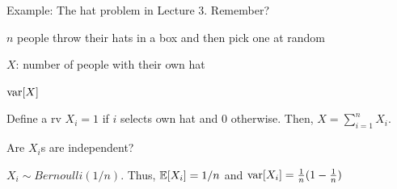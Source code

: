 \documentclass[handout,fleqn,aspectratio=169]{beamer}
\begin{document}
\begin{frame}{Example: The hat problem in Lecture 3. Remember?}

\bigskip

{
\small
\plitemsep 0.05in
\bci 

\item $n$ people throw their hats in a box and then pick one at random

\item $X$: number of people with their own hat

\item {} $\text{var}[ X ]$

\item {} Define a rv $X_i=1$ if $i$ selects own hat and $0$ otherwise. Then, $X = \sum_{i=1}^n X_i.$

\item {} Are $X_i$s are independent? 

\medskip
\item<2-> $X_i \sim Bernoulli(1/n).$ Thus, $\mathbb{E}[ X_i ] = 1/n$ and $\text{var}[ X_i ] = \frac{1}{n}(1-\frac{1}{n})$

\eci
}
{
\small
\plitemsep 0.01in
\bci [$\circ$]
\item {}
\setlength{\jot}{0pt}
\vspace{-0.2in}
\vspace{-0.1in}

\eci

}
\end{frame}
\end{document}
